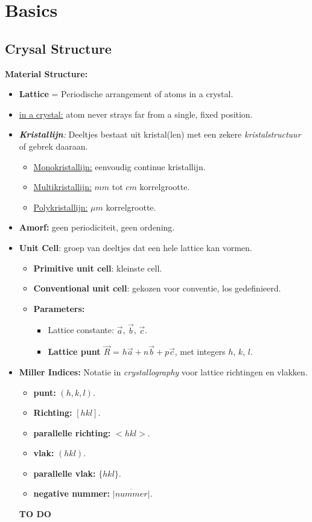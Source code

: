 \section{Basics}
\subsection*{Crysal Structure}
\textbf{Material Structure:}
\begin{itemize}
	\item \textbf{Lattice} = Periodische arrangement of atoms in a crystal.
	\item \underline{in a crystal:} atom never strays far from a single, fixed position.
	\item \textit{\textbf{Kristallijn}:} Deeltjes bestaat uit kristal(len) met een zekere \textit{kristalstructuur} of gebrek daaraan.
	\begin{itemize}
		\item \underline{Monokristallijn:} eenvoudig continue kristallijn.
		\item \underline{Multikristallijn:} $mm$ tot $cm$ korrelgrootte.
		\item \underline{Polykristallijn:} $\mu m$ korrelgrootte.
	\end{itemize}
	\item \textbf{Amorf:} geen periodiciteit, geen ordening.
	\item \textbf{Unit Cell}: groep van deeltjes dat een hele lattice kan vormen.
	\begin{itemize}
		\item \textbf{Primitive unit cell}: kleinste cell.
		\item \textbf{Conventional unit cell}: gekozen voor conventie, los gedefinieerd.
		\item \textbf{Parameters:}
		\begin{itemize}
			\item Lattice constante: $\overrightarrow{a}$, $\overrightarrow{b}$, $\overrightarrow{c}$.
			\item \textbf{Lattice punt $\overrightarrow{R}$} = $h \overrightarrow{a} + n \overrightarrow{b} + p \overrightarrow{c}$, met integers $h$, $k$, $l$.
		\end{itemize}
	\end{itemize}
	\item \textbf{Miller Indices:} Notatie in \textit{crystallography} voor lattice richtingen en vlakken.
	\begin{itemize}
		\item \textbf{punt:} $(h,k,l)$.
		\item \textbf{Richting:} $[hkl]$.
		\item \textbf{parallelle richting:} $<hkl>$.
		\item \textbf{vlak:} $(hkl)$.
		\item \textbf{parallelle vlak:} $\{hkl\}$.
		\item \textbf{negative nummer:} $\overline{|nummer|}$.
	\end{itemize}
	\textbf{TO DO}
\end{itemize}
